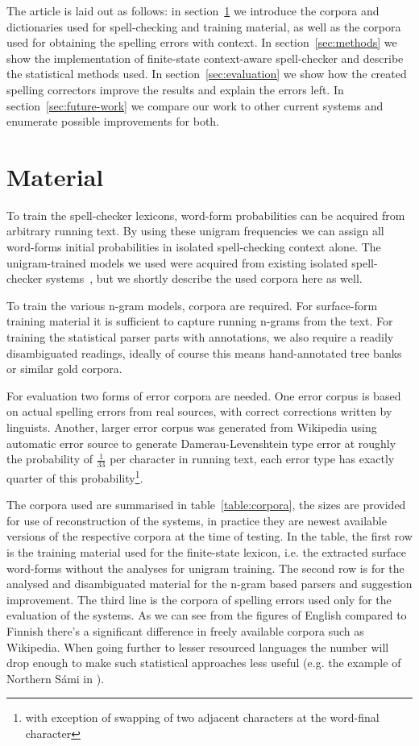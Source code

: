 \documentclass[11pt,a4paper]{article}
\begin{document}
The article is laid out as follows: in section~\ref{sec:material} we introduce
the corpora and dictionaries used for spell-checking and training material, as
well as the corpora used for obtaining the spelling errors with context. In
section~\ref{sec:methods} we show the implementation of finite-state
context-aware spell-checker and describe the statistical methods used. In
section~\ref{sec:evaluation} we show how the created spelling correctors
improve the results and explain the errors left. In
section~\ref{sec:future-work} we compare our work to other current systems and
enumerate possible improvements for both.

\section{Material}
\label{sec:material}

To train the spell-checker lexicons, word-form probabilities can be acquired
from arbitrary running text. By using these unigram frequencies we can assign
all word-forms initial probabilities in isolated spell-checking context alone.
The unigram-trained models we used were acquired from existing isolated
spell-checker systems~\cite{norvig/2010,pirinen/2010/lrec}, but we shortly
describe the used corpora here as well.

To train the various n-gram models, corpora are required. For surface-form
training material it is sufficient to capture running n-grams from the text.
For training the statistical parser parts with annotations, we also require a
readily disambiguated readings, ideally of course this means hand-annotated
tree banks or similar gold corpora. 

For evaluation two forms of error corpora are needed. One error corpus is based
on actual spelling errors from real sources, with correct corrections
written by linguists. Another, larger error corpus was generated from Wikipedia
using automatic error source to generate Damerau-Levenshtein type error at
roughly the probability of $\frac{1}{33}$ per character in running text, each
error type has exactly quarter of this probability\footnote{with exception of
swapping of two adjacent characters at the word-final character}. 

The corpora used are summarised in table~\ref{table:corpora}, the sizes are
provided for use of reconstruction of the systems, in practice they are newest
available versions of the respective corpora at the time of testing. In the
table, the first row is the training material used for the finite-state
lexicon, i.e. the extracted surface word-forms without the analyses for unigram
training. The second row is for the analysed and disambiguated material for the
n-gram based parsers and suggestion improvement. The third line is the corpora
of spelling errors used only for the evaluation of the systems.  As we can see
from the figures of English compared to Finnish there's a significant
difference in freely available corpora such as Wikipedia. When going further to
lesser resourced languages the number will drop enough to make such statistical
approaches less useful (e.g. the example of Northern S\'{a}mi in
\cite{pirinen/2010/lrec}).
\end{document}
